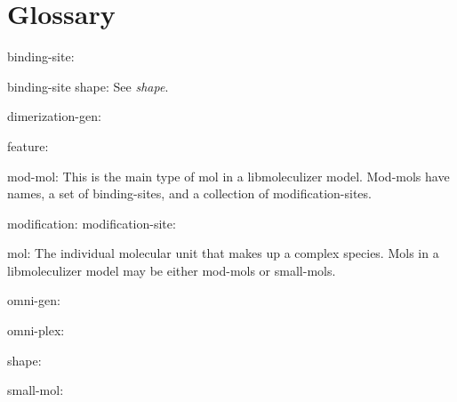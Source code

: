 \chapter{Glossary}

{\bt binding-site: }

{\bt binding-site shape: } See {\it shape}.

{\bt dimerization-gen: } 

{\bt feature: }

{\bt mod-mol: } This is the main type of mol in a libmoleculizer
model.  Mod-mols have names, a set of binding-sites, and a
collection of modification-sites.

{\bt modification: }
{\bt modification-site: }

{\bt mol: } The individual molecular unit that makes up a complex
species.  Mols in a libmoleculizer model may be either mod-mols or
small-mols.

{\bt omni-gen: }

{\bt omni-plex: } 

{\bt shape: } 

{\bt small-mol: }